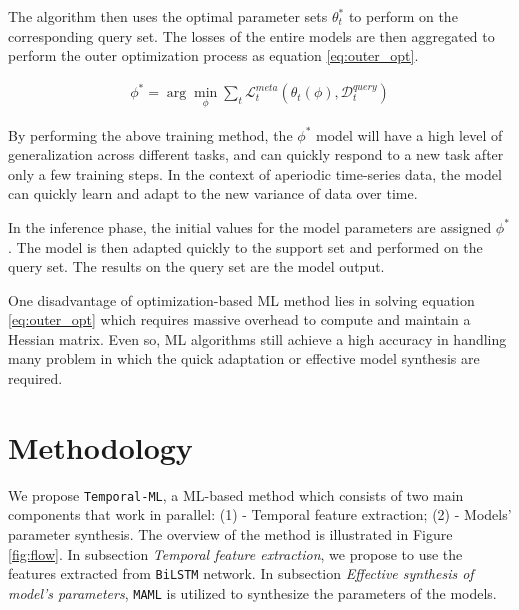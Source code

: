 \documentclass[a4paper,fleqn]{cas-sc}
\begin{document}
\vspace{1mm}

The algorithm then uses the optimal parameter sets $\theta_t^*$ to perform on the corresponding query set. The losses of the entire models are then aggregated to perform the outer optimization process as equation \ref{eq:outer_opt}.

\begin{align}
    \phi^* = \arg\min_{\phi}\sum_{t}{\mathcal{L}^{meta}_t\left( \theta_t(\phi), \mathcal{D}_t^{query} \right)}
    \label{eq:outer_opt}
\end{align}

By performing the above training method, the $\phi^*$ model will have a high level of generalization across different tasks, and can quickly respond to a new task after only a few training steps. In the context of aperiodic time-series data, the model can quickly learn and adapt to the new variance of data over time.

\vspace{1mm}

In the inference phase, the initial values for the model parameters are assigned $\phi^*$. The model is then adapted quickly to the support set and performed on the query set. The results on the query set are the model output.

\vspace{1mm}

One disadvantage of optimization-based ML method lies in solving equation \ref{eq:outer_opt} which requires massive overhead to compute and maintain a Hessian matrix. Even so, ML algorithms still achieve a high accuracy in handling many problem in which the quick adaptation or effective model synthesis are required.

\section{Methodology}

We propose \verb|Temporal-ML|, a ML-based method which consists of two main components that work in parallel: (1) - Temporal feature extraction; (2) - Models' parameter synthesis. The overview of the method is illustrated in Figure \ref{fig:flow}. In subsection \textit{Temporal feature extraction}, we propose to use the features extracted from \verb|BiLSTM| network. In subsection \textit{Effective synthesis of model's parameters}, \verb|MAML| is utilized to synthesize the parameters of the models.

\vspace{1mm}
\end{document}

